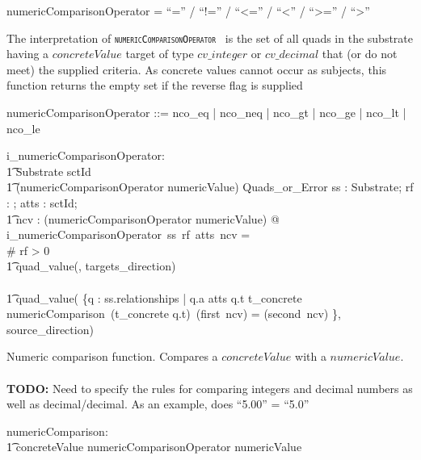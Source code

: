 \documentclass{article}
\def\spec#1{{\tt \small \textsc{{#1}} }}
\def\bnf#1{{\scriptsize {{#1}} }}
\begin{document}
\begin{framed}
\noindent
\bnf{numericComparisonOperator = ``='' / ``!='' / ``\textless='' / ``\textless'' / ``\textgreater='' / ``\textgreater''}
\end{framed}

The interpretation of \spec{numericComparisonOperator} is the set of all quads in the substrate having a  $concreteValue$ target of type $cv\_integer$ or $cv\_decimal$ that (or do not meet) the supplied 
criteria. As concrete values cannot occur as subjects, this function returns the empty set if the reverse flag is supplied


\begin{zed}
numericComparisonOperator ::= nco\_eq | nco\_neq | nco\_gt | nco\_ge | nco\_lt | nco\_le
\end{zed}

\begin{axdef}
   i\_numericComparisonOperator: \\
\t1 Substrate \fun  \optional[reverseFlag] \fun \power sctId \fun \\
\t1 (numericComparisonOperator \cross numericValue) \fun Quads\_or\_Error
\where
    \forall ss : Substrate; rf : \optional[reverseFlag]; atts : \power sctId; \\
\t1 ncv : (numericComparisonOperator \cross numericValue)  @ \\
    i\_numericComparisonOperator~ss~rf~atts~ncv = \\
\IF \# rf > 0 \THEN \\
\t1 quad\_value(\emptyset, targets\_direction) \\
\ELSE \\
\t1 quad\_value( \{q : ss.relationships | q.a \in atts \land q.t \in \ran t\_concrete \land  \\
numericComparison~(t\_concrete \inv q.t)~(first~ncv) = (second~ncv) \}, source\_direction)
 \end{axdef}
 
 Numeric comparison function. Compares a $concreteValue$ with a $numericValue$.
 \paragraph{}
 \textbf{TODO:} Need to specify the rules for comparing integers and decimal numbers as well as decimal/decimal.  As an example, does ``5.00'' = ``5.0''
 \begin{axdef}
    numericComparison: \\
\t1 concreteValue \fun numericComparisonOperator \pfun numericValue
 \end{axdef}
 
\end{document}
